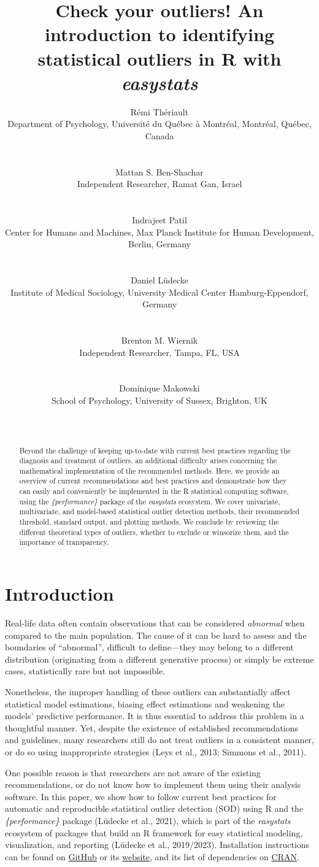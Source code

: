 \documentclass{article}
\title{Check your outliers! An introduction to identifying statistical
outliers in R with \emph{easystats}}
\author{
    Rémi Thériault
   \\
    Department of Psychology, Université du Québec à Montréal, Montréal,
Québec, Canada \\
   \\
  \texttt{} \\
   \And
    Mattan S. Ben-Shachar
   \\
    Independent Researcher, Ramat Gan, Israel \\
   \\
  \texttt{} \\
   \And
    Indrajeet Patil
   \\
    Center for Humans and Machines, Max Planck Institute for Human
Development, Berlin, Germany \\
   \\
  \texttt{} \\
   \And
    Daniel Lüdecke
   \\
    Institute of Medical Sociology, University Medical Center
Hamburg-Eppendorf, Germany \\
   \\
  \texttt{} \\
   \And
    Brenton M. Wiernik
   \\
    Independent Researcher, Tampa, FL, USA \\
   \\
  \texttt{} \\
   \And
    Dominique Makowski
   \\
    School of Psychology, University of Sussex, Brighton, UK \\
   \\
  \texttt{} \\
  }
\begin{document}
\maketitle


\begin{abstract}
Beyond the challenge of keeping up-to-date with current best practices
regarding the diagnosis and treatment of outliers, an additional
difficulty arises concerning the mathematical implementation of the
recommended methods. Here, we provide an overview of current
recommendations and best practices and demonstrate how they can easily
and conveniently be implemented in the R statistical computing software,
using the \emph{\{performance\}} package of the \emph{easystats}
ecosystem. We cover univariate, multivariate, and model-based
statistical outlier detection methods, their recommended threshold,
standard output, and plotting methods. We conclude by reviewing the
different theoretical types of outliers, whether to exclude or winsorize
them, and the importance of transparency.
\end{abstract}


\hypertarget{introduction}{%
\section{Introduction}\label{introduction}}

Real-life data often contain observations that can be considered
\emph{abnormal} when compared to the main population. The cause of it
can be hard to assess and the boundaries of ``abnormal'', difficult to
define---they may belong to a different distribution (originating from a
different generative process) or simply be extreme cases, statistically
rare but not impossible.

Nonetheless, the improper handling of these outliers can substantially
affect statistical model estimations, biasing effect estimations and
weakening the models' predictive performance. It is thus essential to
address this problem in a thoughtful manner. Yet, despite the existence
of established recommendations and guidelines, many researchers still do
not treat outliers in a consistent manner, or do so using inappropriate
strategies (Leys et al., 2013; Simmons et al., 2011).

One possible reason is that researchers are not aware of the existing
recommendations, or do not know how to implement them using their
analysis software. In this paper, we show how to follow current best
practices for automatic and reproducible statistical outlier detection
(SOD) using R and the \emph{\{performance\}} package (Lüdecke et al.,
2021), which is part of the \emph{easystats} ecosystem of packages that
build an R framework for easy statistical modeling, visualization, and
reporting (Lüdecke et al., 2019/2023). Installation instructions can be
found on \href{https://github.com/easystats/performance}{GitHub} or its
\href{https://easystats.github.io/performance/}{website}, and its list
of dependencies on
\href{https://cran.r-project.org/package=performance}{CRAN}.
\end{document}
